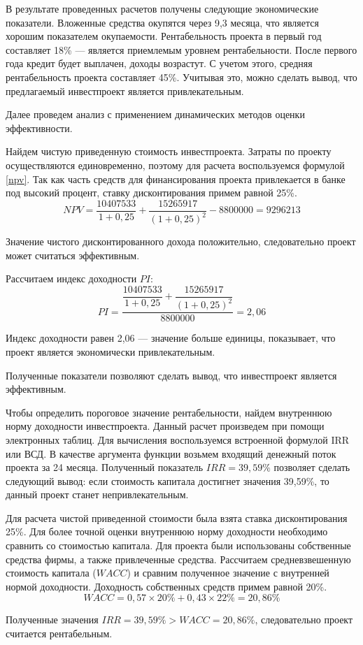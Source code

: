 В результате проведенных расчетов получены следующие экономические показатели. Вложенные средства окупятся через 9,3 месяца, что является хорошим показателем окупаемости. Рентабельность проекта в первый год составляет 18\% --- является приемлемым уровнем рентабельности. После первого года кредит будет выплачен, доходы возрастут. С учетом этого, средняя рентабельность проекта составляет 45\%. Учитывая это, можно сделать вывод, что предлагаемый инвестпроект является привлекательным.



Далее проведем анализ с применением динамических методов оценки эффективности.

Найдем чистую приведенную стоимость инвестпроекта. Затраты по проекту осуществляются единовременно, поэтому для расчета воспользуемся формулой \eqref{npv}. Так как часть средств для финансирования проекта привлекается в банке под высокий процент, ставку дисконтирования примем равной 25\%.
\begin{equation*}\label{npv_mod}
NPV =  \dfrac{10407533}{1+0,25} + \dfrac{15265917}{(1+0,25)^2}- 8800000 = 9296213
\end{equation*}

Значение чистого дисконтированного дохода положительно, следовательно проект может считаться эффективным.

Рассчитаем индекс доходности $PI$:
\begin{equation*}
PI = \dfrac{\dfrac{10407533}{1+0,25} + \dfrac{15265917}{(1+0,25)^2}}{8800000} = 2,06
\end{equation*}

Индекс доходности равен 2,06 --- значение больше единицы, показывает, что проект является экономически привлекательным.

Полученные показатели позволяют сделать вывод, что инвестпроект является эффективным.

Чтобы определить пороговое значение рентабельности, найдем внутреннюю норму доходности инвестпроекта. Данный расчет произведем при помощи электронных таблиц. Для вычисления воспользуемся встроенной формулой IRR или ВСД. В качестве аргумента функции возьмем входящий денежный поток проекта за 24 месяца. Полученный показатель $IRR = 39,59\%$ позволяет сделать следующий вывод: если стоимость капитала достигнет значения 39,59\%, то данный проект станет непривлекательным.

Для расчета чистой приведенной стоимости была взята ставка дисконтирования 25\%. Для более точной оценки внутреннюю норму доходности необходимо сравнить со стоимостью капитала. Для проекта были использованы собственные средства фирмы, а также привлеченные средства. Рассчитаем средневзвешенную стоимость капитала ($WACC$) и сравним полученное значение с внутренней нормой доходности. Доходность собственных средств примем равной 20\%.
\begin{equation*}
WACC = 0,57 \times 20\% + 0,43 \times 22\% = 20,86\%
\end{equation*}

Полученные значения  $IRR = 39,59\% > WACC= 20,86\%$, следовательно проект считается рентабельным.



